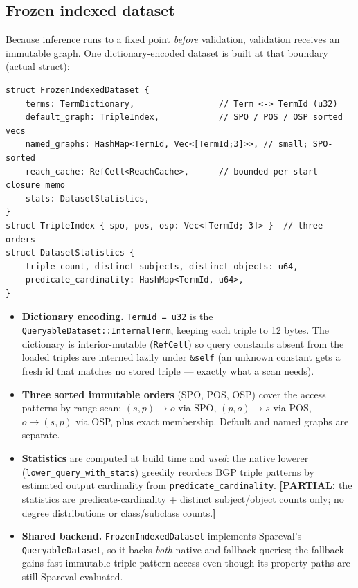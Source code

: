 \documentclass[11pt]{article}
\newcommand{\code}[1]{\texttt{#1}}
\theoremstyle{definition}
\newcommand{\PART}[1]{{\color{nired}\textbf{[PARTIAL:} #1\textbf{]}}}
\begin{document}
\subsection{Frozen indexed dataset}\label{sec:frozen}
Because inference runs to a fixed point \emph{before} validation, validation
receives an immutable graph. One dictionary-encoded dataset is built at that
boundary (actual struct):
\begin{lstlisting}
struct FrozenIndexedDataset {
    terms: TermDictionary,                 // Term <-> TermId (u32)
    default_graph: TripleIndex,            // SPO / POS / OSP sorted vecs
    named_graphs: HashMap<TermId, Vec<[TermId;3]>>, // small; SPO-sorted
    reach_cache: RefCell<ReachCache>,      // bounded per-start closure memo
    stats: DatasetStatistics,
}
struct TripleIndex { spo, pos, osp: Vec<[TermId; 3]> }  // three orders
struct DatasetStatistics {
    triple_count, distinct_subjects, distinct_objects: u64,
    predicate_cardinality: HashMap<TermId, u64>,
}
\end{lstlisting}
\begin{itemize}[leftmargin=1.4em]
  \item \textbf{Dictionary encoding.} \code{TermId = u32} is the
  \code{QueryableDataset::InternalTerm}, keeping each triple to 12 bytes. The
  dictionary is interior-mutable (\code{RefCell}) so query constants absent from
  the loaded triples are interned lazily under \code{\&self} (an unknown constant
  gets a fresh id that matches no stored triple --- exactly what a scan needs).
  \item \textbf{Three sorted immutable orders} (SPO, POS, OSP) cover the access
  patterns by range scan: $(s,p)\to o$ via SPO, $(p,o)\to s$ via POS,
  $o\to(s,p)$ via OSP, plus exact membership. Default and named graphs are
  separate.
  \item \textbf{Statistics} are computed at build time and \emph{used}: the native
  lowerer (\code{lower\_query\_with\_stats}) greedily reorders BGP triple patterns
  by estimated output cardinality from \code{predicate\_cardinality}. \PART{the
  statistics are predicate-cardinality + distinct subject/object counts only; no
  degree distributions or class/subclass counts.}
  \item \textbf{Shared backend.} \code{FrozenIndexedDataset} implements
  Spareval's \code{QueryableDataset}, so it backs \emph{both} native and fallback
  queries; the fallback gains fast immutable triple-pattern access even though its
  property paths are still Spareval-evaluated.
\end{itemize}
\end{document}
